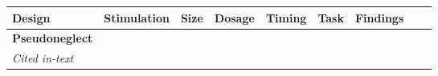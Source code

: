 \documentclass[11pt,]{memoir}
\begin{document}
\begin{longtable}[]{@{}lllllllll@{}}
\begin{minipage}[b]{0.04\columnwidth}
Design\strut
\end{minipage} & \begin{minipage}[b]{0.10\columnwidth}\raggedright
Stimulation\strut
\end{minipage} & \begin{minipage}[b]{0.04\columnwidth}\raggedright
Size\strut
\end{minipage} & \begin{minipage}[b]{0.04\columnwidth}\raggedright
Dosage\strut
\end{minipage} & \begin{minipage}[b]{0.04\columnwidth}\raggedright
Timing\strut
\end{minipage} & \begin{minipage}[b]{0.10\columnwidth}\raggedright
Task\strut
\end{minipage} & \begin{minipage}[b]{0.28\columnwidth}\raggedright
Findings\strut
\end{minipage}\tabularnewline
\midrule
\endhead
\begin{minipage}[t]{0.09\columnwidth}\raggedright
\textbf{Pseudoneglect}\strut
\end{minipage} & \begin{minipage}[t]{0.02\columnwidth}\raggedright
\strut
\end{minipage} & \begin{minipage}[t]{0.04\columnwidth}\raggedright
\strut
\end{minipage} & \begin{minipage}[t]{0.10\columnwidth}\raggedright
\strut
\end{minipage} & \begin{minipage}[t]{0.04\columnwidth}\raggedright
\strut
\end{minipage} & \begin{minipage}[t]{0.04\columnwidth}\raggedright
\strut
\end{minipage} & \begin{minipage}[t]{0.04\columnwidth}\raggedright
\strut
\end{minipage} & \begin{minipage}[t]{0.10\columnwidth}\raggedright
\strut
\end{minipage} & \begin{minipage}[t]{0.28\columnwidth}\raggedright
\strut
\end{minipage}\tabularnewline
\begin{minipage}[t]{0.09\columnwidth}\raggedright
\emph{Cited in-text}\strut

\end{minipage}
\end{longtable}
\end{document}
